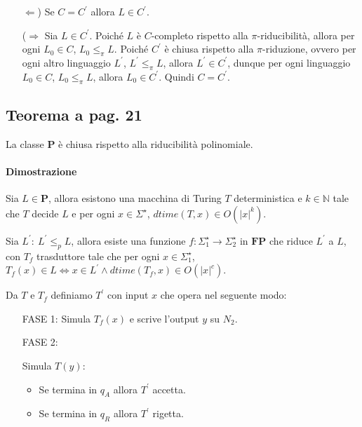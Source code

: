 \begin{itemize}
    \item [$\Leftarrow$)] Se $C = C^{'}$ allora $L \in C^{'}$.
    \item [($\Rightarrow$]{
        Sia $L \in C^{'}$. Poiché $L$ è $C$-completo rispetto alla $\pi$-riducibilità, allora per ogni $L_{0} \in C$, 
        $L_{0} \leq_{\pi} L$. Poiché $C^{'}$ è chiusa rispetto alla $\pi$-riduzione, ovvero per ogni altro linguaggio 
        $L^{'}$, $L^{'} \leq_{\pi} L$, allora $L^{'} \in C^{'}$, dunque per ogni linguaggio $L_{0} \in C$, $L_{0} \leq_{\pi} L$,
        allora $L_{0} \in C^{'}$. Quindi $C = C^{'}$.
    }
\end{itemize}

\newpage
\subsection{Teorema a pag. 21}

La classe \textbf{P} è chiusa rispetto alla riducibilità polinomiale.

\paragraph*{Dimostrazione}

Sia $L \in \textbf{P}$, allora esistono una macchina di Turing $T$ deterministica e $k \in \mathbb{N}$ tale che $T$ decide $L$ e 
per ogni $x \in \Sigma^{\star}$, $dtime(T, x) \in O(|x|^k)$.

Sia $L^{'}:\ L^{'} \leq_{p} L$, allora esiste una funzione $f: \Sigma^{\star}_{1} \rightarrow \Sigma^{\star}_{2}$ in $\textbf{FP}$
che riduce $L^{'}$ a $L$, con $T_{f}$ trasduttore tale che per ogni $x \in \Sigma^{\star}_{1}$, $T_{f}(x) \in L \Leftrightarrow x \in L^{'}
\land dtime(T_{f}, x) \in O(|x|^c)$.

Da $T$ e $T_{f}$ definiamo $T^{'}$ con input $x$ che opera nel seguente modo:

\begin{itemize}
    \item [FASE 1:] Simula $T_{f}(x)$ e scrive l'output $y$ su $N_{2}$.
    \item [FASE 2:] {
        Simula $T(y)$:
        \begin{itemize}
            \item Se termina in $q_{A}$ allora $T^{'}$ accetta.
            \item Se termina in $q_{R}$ allora $T^{'}$ rigetta.
        \end{itemize}
    }
\end{itemize}